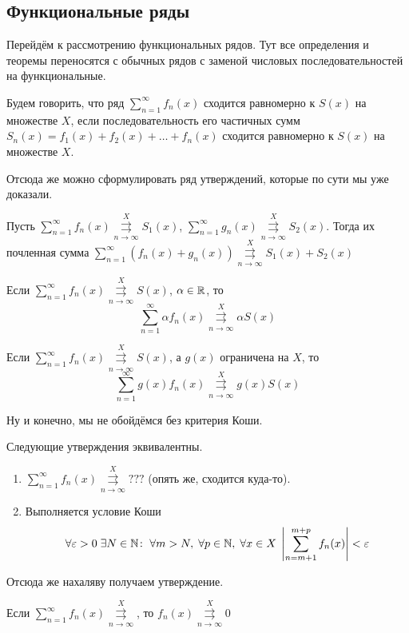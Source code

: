 \documentclass[a4paper, 12pt]{article}
\begin{document}
	\subsection{Функциональные ряды}
	Перейдём к рассмотрению функциональных рядов. Тут все определения и теоремы переносятся с обычных рядов с заменой числовых последовательностей на функциональные.
	\begin{Def}
		Будем говорить, что ряд $\sum\limits_{n=1}^{\infty}f_n(x)$ сходится равномерно к $S(x)$ на множестве $X$, если последовательность его частичных сумм $S_n(x) = f_1(x) + f_2(x) + \ldots + f_n(x)$ сходится равномерно к $S(x)$ на множестве $X$. 
	\end{Def}
	Отсюда же можно сформулировать ряд утверждений, которые по сути мы уже доказали.
	\begin{Statement}
		Пусть $\sum\limits_{n=1}^\infty f_n(x) \overset{X}{\underset{n\to\infty}{\rightrightarrows}} S_1(x)$, 
		$\sum\limits_{n=1}^\infty g_n(x) \overset{X}{\underset{n\to\infty}{\rightrightarrows}} S_2(x)$. Тогда их почленная сумма $\sum\limits_{n=1}^\infty  (f_n(x) + g_n(x) ) \overset{X}{\underset{n\to\infty}{\rightrightarrows}} S_1(x) + S_2(x)$
	\end{Statement}
	\begin{Statement}
		Если $\sum\limits_{n=1}^\infty f_n(x) \overset{X}{\underset{n\to\infty}{\rightrightarrows}} S(x)$, $\alpha \in \mathbb{R}$, то
		$$
			\sum\limits_{n=1}^\infty \alpha f_n(x) \overset{X}{\underset{n\to\infty}{\rightrightarrows}} \alpha S(x)
		$$
	\end{Statement}
	\begin{Statement}
		Если $\sum\limits_{n=1}^\infty f_n(x) \overset{X}{\underset{n\to\infty}{\rightrightarrows}} S(x)$, а $g(x)$ ограничена на $X$, то 
		$$
		\sum\limits_{n=1}^\infty g(x) f_n(x) \overset{X}{\underset{n\to\infty}{\rightrightarrows}} g(x)S(x)
		$$
	\end{Statement}
	Ну и конечно, мы не обойдёмся без критерия Коши.
	\begin{Statement}
		Следующие утверждения эквивалентны.
		\begin{enumerate}
			\item $\sum\limits_{n=1}^\infty f_n(x) \overset{X}{\underset{n\to\infty}{\rightrightarrows}} ???$ (опять же, сходится куда-то).
			\item Выполняется условие Коши 
			$$\forall \varepsilon >0\; \exists N \in \mathbb{N}\colon \; \forall m>N,\; \forall p \in \mathbb{N},\; \forall x\in X\; \left|\sum_{n=m+1}^{m+p} f_n(x)\right| < \varepsilon
			$$
		\end{enumerate}
	\end{Statement}
	Отсюда же нахаляву получаем утверждение.
	\begin{Statement}
		Если $\sum\limits_{n=1}^\infty f_n(x)  \overset{X}{\underset{n\to\infty}{\rightrightarrows}}$, то $f_n(x) \overset{X}{\underset{n\to\infty}{\rightrightarrows}} 0$
	\end{Statement}
\end{document}
